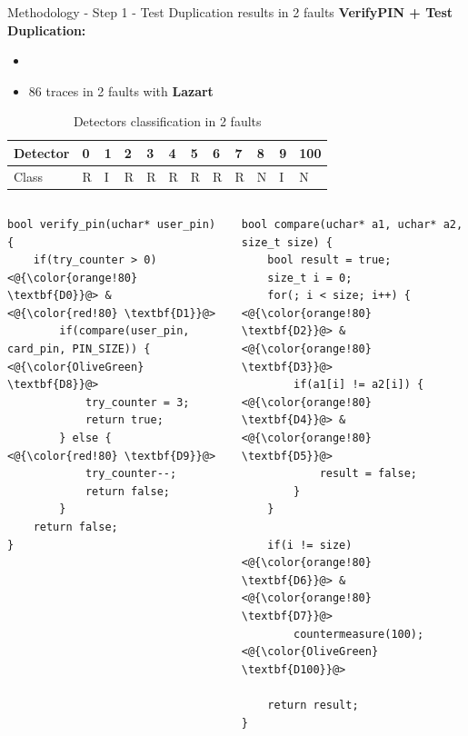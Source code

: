 \begin{frame}[fragile]{Methodology - Step 1 - Test Duplication results in 2 faults}
    \textbf{VerifyPIN + Test Duplication:}
    \begin{itemize}
        \item[]
        \item 86 traces in 2 faults with \textbf{Lazart}
    \end{itemize}
    
    \begin{table}[]
        \caption{Detectors classification in 2 faults}
        \begin{tabular}{|l|l|l|l|l|l|l|l|l|l|l|l|}
            \hline
            \rowcolor[HTML]{C0C0C0} 
            Detector                           & 0 & 1                         & 2 & 3 & 4 & 5 & 6 & 7 & 8                         & 9                         & 100                       \\ \hline
            \rowcolor[HTML]{FFAC67} 
            \cellcolor[HTML]{C0C0C0}Class & R & \cellcolor[HTML]{FF8585}I & R & R & R & R & R & R & \cellcolor[HTML]{9AFF99}N & \cellcolor[HTML]{FF8585}I & \cellcolor[HTML]{9AFF99}N \\ \hline
        \end{tabular}
    \end{table}

    \begin{columns}
        \begin{column}{0.50\textwidth}
            \lstset{style=customc}
            \begin{lstlisting}
bool verify_pin(uchar* user_pin) {
    if(try_counter > 0)      <@{\color{orange!80} \textbf{D0}}@> & <@{\color{red!80} \textbf{D1}}@>
        if(compare(user_pin, card_pin, PIN_SIZE)) {  <@{\color{OliveGreen} \textbf{D8}}@>
            try_counter = 3;
            return true;
        } else {  <@{\color{red!80} \textbf{D9}}@>
            try_counter--;
            return false;
        }
    return false;
}
            \end{lstlisting}
        \end{column}
        \begin{column}{0.5\textwidth}
            \lstset{style=customc}
            \begin{lstlisting}  
bool compare(uchar* a1, uchar* a2, size_t size) {
    bool result = true;
    size_t i = 0;
    for(; i < size; i++) {  <@{\color{orange!80} \textbf{D2}}@> & <@{\color{orange!80} \textbf{D3}}@>
        if(a1[i] != a2[i]) {  <@{\color{orange!80} \textbf{D4}}@> & <@{\color{orange!80} \textbf{D5}}@>
            result = false; 
        }
    }

    if(i != size)  <@{\color{orange!80} \textbf{D6}}@> & <@{\color{orange!80} \textbf{D7}}@>
        countermeasure(100);  <@{\color{OliveGreen} \textbf{D100}}@>

    return result;
}
            \end{lstlisting}
    	\vfill
        \end{column}
    \end{columns}
\end{frame}

